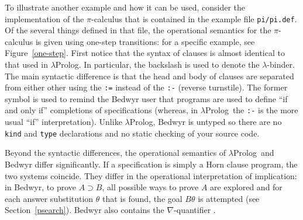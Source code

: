 \documentclass{article}
\newcommand{\lp}{$\lambda$Prolog}
\begin{document}
To illustrate another example and how it
can be used, consider the implementation of the $\pi$-calculus that is
contained in the example file \verb+pi/pi.def+.  Of the several
things defined in that file, the operational semantics for the
$\pi$-calculus is given using one-step transitions: for a specific
example, see Figure~\ref{one-step}.  First notice that the syntax of
clauses is almost identical to that used in $\lambda$Prolog.  In
particular, the backslash is used to denote the $\lambda$-binder.  The
main syntactic difference is that the head and body of clauses are
separated from either other using the \verb+:=+ instead of the
\verb+:-+ (reverse turnstile).  The former symbol is used to remind
the Bedwyr user that programs are used to define ``if and only if''
completions of specifications (whereas, in \lp\ the \verb+:-+ is the
more usual ``if'' interpretation).  Unlike \lp, Bedwyr is
untyped so there are no {\tt kind} and {\tt type} declarations and no
static checking of your source code.  

Beyond the syntactic differences, the operational semantics of \lp\
and Bedwyr differ significantly.  If a specification is simply a Horn
clause program, the two systems coincide. They differ in the operational
interpretation of implication: in Bedwyr, to prove $A\supset B$, all 
possible ways to prove $A$ are explored and 
for each answer substitution $\theta$ that is found, the goal
$B\theta$ is attempted (see Section~\ref{psearch}).  Bedwyr also
contains the $\nabla$-quantifier \cite{miller05tocl}. 
\end{document}
